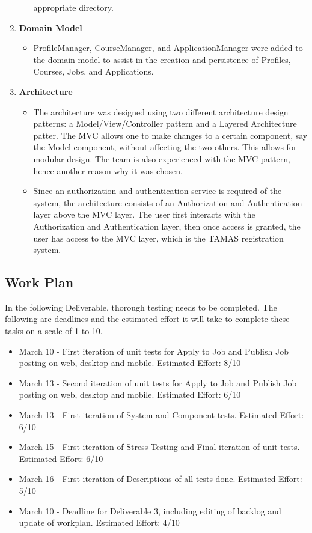\documentclass[12pt]{article}
\begin{document}
\begin{enumerate}
\begin{itemize}
			appropriate directory.
    \end{itemize}
    \item \textbf{Domain Model}
    \begin{itemize}
        \item ProfileManager, CourseManager, and ApplicationManager were added to the domain model
			to assist in the creation and persistence of Profiles, Courses, Jobs, and Applications.
    \end{itemize}
	\item \textbf{Architecture}
	\begin{itemize}
		\item The architecture was designed using two different architecture design patterns: a Model/View/Controller pattern and a Layered Architecture patter. The MVC allows one to make changes to a certain component, say the Model component, without affecting the two others. This allows for modular design. The team is also experienced with the MVC pattern, hence another reason why it was chosen.
		\item Since an authorization and authentication service is required of the system, the architecture consists of an Authorization and Authentication layer above the MVC layer. The user first interacts with the Authorization and Authentication layer, then once access is granted, the user has access to the MVC layer, which is the TAMAS registration system.
	\end{itemize}
\end{enumerate}

\subsection{Work Plan}

In the following Deliverable, thorough testing needs to be completed. The following are deadlines and the estimated effort it will take to complete these tasks on a scale of 1 to 10.

\begin{itemize}
    \item March 10 - First iteration of unit tests for Apply to Job and Publish Job posting on web, desktop and mobile. Estimated Effort: 8/10
    \item March 13 - Second iteration of unit tests for Apply to Job and Publish Job posting on web, desktop and mobile. Estimated Effort: 6/10
    \item March 13 - First iteration of System and Component tests. Estimated Effort: 6/10
    \item March 15 - First iteration of Stress Testing and Final iteration of unit tests. Estimated Effort: 6/10
    \item March 16 - First iteration of Descriptions of all tests done. Estimated Effort: 5/10
    \item March 10 - Deadline for Deliverable 3, including editing of backlog and update of workplan. Estimated Effort: 4/10

\end{itemize}
\end{document}
